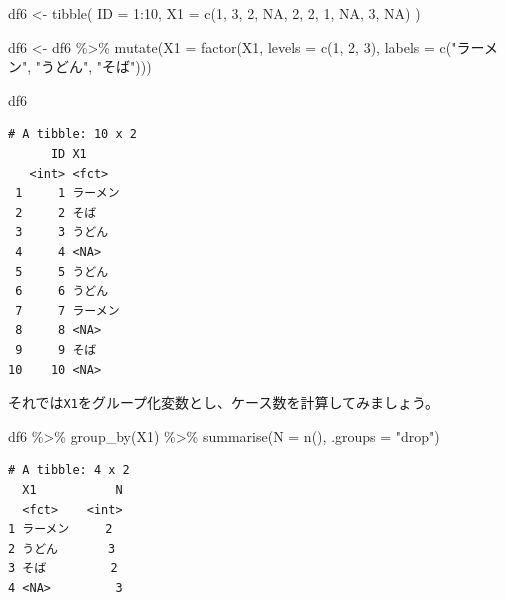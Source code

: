 \documentclass[
  a4paper,
  pandoc,
  ja=standard,
  jafont=haranoaji]{bxjsbook}
\newenvironment{Shaded}{\begin{snugshade}}{\end{snugshade}}
\newcommand{\AttributeTok}[1]{\textcolor[rgb]{0.00,0.48,0.65}{#1}}
\newcommand{\ConstantTok}[1]{\textcolor[rgb]{0.56,0.35,0.01}{#1}}
\newcommand{\DecValTok}[1]{\textcolor[rgb]{0.68,0.00,0.00}{#1}}
\newcommand{\FunctionTok}[1]{\textcolor[rgb]{0.28,0.35,0.67}{#1}}
\newcommand{\NormalTok}[1]{\textcolor[rgb]{0.00,0.48,0.65}{#1}}
\newcommand{\OtherTok}[1]{\textcolor[rgb]{0.00,0.48,0.65}{#1}}
\newcommand{\SpecialCharTok}[1]{\textcolor[rgb]{0.37,0.37,0.37}{#1}}
\newcommand{\StringTok}[1]{\textcolor[rgb]{0.13,0.47,0.30}{#1}}
\begin{document}
\begin{Shaded}
\begin{Highlighting}[numbers=left,,]
\NormalTok{df6 }\OtherTok{\textless{}{-}} \FunctionTok{tibble}\NormalTok{(}
  \AttributeTok{ID =} \DecValTok{1}\SpecialCharTok{:}\DecValTok{10}\NormalTok{,}
  \AttributeTok{X1 =} \FunctionTok{c}\NormalTok{(}\DecValTok{1}\NormalTok{, }\DecValTok{3}\NormalTok{, }\DecValTok{2}\NormalTok{, }\ConstantTok{NA}\NormalTok{, }\DecValTok{2}\NormalTok{, }\DecValTok{2}\NormalTok{, }\DecValTok{1}\NormalTok{, }\ConstantTok{NA}\NormalTok{, }\DecValTok{3}\NormalTok{, }\ConstantTok{NA}\NormalTok{)}
\NormalTok{)}

\NormalTok{df6 }\OtherTok{\textless{}{-}}\NormalTok{ df6 }\SpecialCharTok{\%\textgreater{}\%}
  \FunctionTok{mutate}\NormalTok{(}\AttributeTok{X1 =} \FunctionTok{factor}\NormalTok{(X1, }
                     \AttributeTok{levels =} \FunctionTok{c}\NormalTok{(}\DecValTok{1}\NormalTok{, }\DecValTok{2}\NormalTok{, }\DecValTok{3}\NormalTok{),}
                     \AttributeTok{labels =} \FunctionTok{c}\NormalTok{(}\StringTok{"ラーメン"}\NormalTok{, }\StringTok{"うどん"}\NormalTok{, }\StringTok{"そば"}\NormalTok{)))}

\NormalTok{df6}
\end{Highlighting}
\end{Shaded}

\begin{verbatim}
# A tibble: 10 x 2
      ID X1      
   <int> <fct>   
 1     1 ラーメン
 2     2 そば    
 3     3 うどん  
 4     4 <NA>    
 5     5 うどん  
 6     6 うどん  
 7     7 ラーメン
 8     8 <NA>    
 9     9 そば    
10    10 <NA>    
\end{verbatim}

それでは\texttt{X1}をグループ化変数とし、ケース数を計算してみましょう。

\begin{Shaded}
\begin{Highlighting}[numbers=left,,]
\NormalTok{df6 }\SpecialCharTok{\%\textgreater{}\%}
  \FunctionTok{group\_by}\NormalTok{(X1) }\SpecialCharTok{\%\textgreater{}\%}
  \FunctionTok{summarise}\NormalTok{(}\AttributeTok{N       =} \FunctionTok{n}\NormalTok{(),}
            \AttributeTok{.groups =} \StringTok{"drop"}\NormalTok{)}
\end{Highlighting}
\end{Shaded}

\begin{verbatim}
# A tibble: 4 x 2
  X1           N
  <fct>    <int>
1 ラーメン     2
2 うどん       3
3 そば         2
4 <NA>         3
\end{verbatim}
\end{document}
